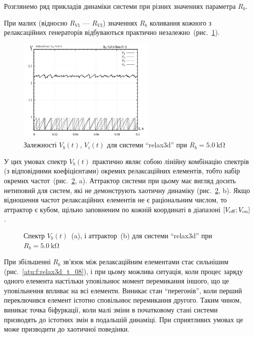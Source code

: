 Розглянемо ряд прикладів динаміки системи при різних значеннях
параметра $R_b$.

При малих (відносно $ R_{V1} $ --- $ R_{V3} $) значеннях
$R_b $ коливання кожного з релаксаційних генераторів відбуваються
практично незалежно~(рис.~\ref{atu:f:relax3d_t_02}).

\begin{figure}[htb!]
  \centerline{\includegraphics[width=0.6\textwidth]{p/relax3d_t_02.png} }
  \caption{Залежності $V_b(t)$, $V_i(t)$ для системи ``relax3d'' при $R_b=\SI{5.0}{\kilo\ohm}$ }
  \label{atu:f:relax3d_t_02}
\end{figure}


У цих умовах спектр
$V_b (t) $ практично являє собою лінійну комбінацію спектрів (з
відповідними коефіцієнтами) окремих релаксаційних елементів,
тобто набір окремих частот~(рис.~\ref{atu:f:relax3d_f_02}, a). Аттрактор
системи при цьому має вигляд досить нетиповий для систем, які
не демонструють хаотичну динаміку (рис.~\ref{atu:f:relax3d_f_02}, b). Якщо
відношення частот релаксаційних елементів не є раціональним
числом, то аттрактор є кубом, щільно заповненим по кожній
координаті в діапазоні
$[V _\mathrm{off}; V _\mathrm{on}] $.


\begin{figure}[htb!]
  \caption{Спектр $ V_b (t) $~(a), і аттрактор~(b) для системи ``relax3d'' при $ R_b = \SI{5.0}{\kilo \ohm} $}
\label{atu:f:relax3d_f_02}
\end{figure}

При збільшенні
$R_b$ зв'язок між релаксаційним елементами стає сильнішим
(рис.~\ref{atu:f:relax3d_t_08}), і при цьому можлива ситуація, коли процес
заряду одного елемента настільки уповільнює момент перемикання
іншого, що це уповільнення впливає на всі елементи. Виникає стан
``перегонів'', коли перший переключився елемент істотно сповільнює
перемикання другого. Таким чином, виникає точка біфуркації,
коли малі зміни в початковому стані системи призводять до
істотних змін в подальшій динаміці. При сприятливих умовах
це може призводити до хаотичної поведінки.


